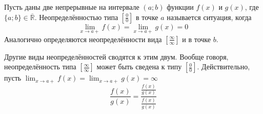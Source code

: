 Пусть даны две непрерывные на интервале $(a; b)$ функции $f(x)$ и $g(x)$, где $\{a; b\} \in \overline{\mathbb{R}}$. Неопределённостью типа $\left[\frac{0}{0}\right]$ в точке $a$ называется ситуация, когда
\[
\lim_{x \to a+}f(x) = \lim_{x \to a+}g(x) = 0
\]
Аналогично определяются неопределённости вида $\left[\frac{\infty}{\infty}\right]$ и в точке $b$.

Другие виды неопределённостей сводятся к этим двум. Вообще говоря, неопределённость типа $\left[\frac{\infty}{\infty}\right]$ может быть сведена к типу $\left[\frac{0}{0}\right]$. Действительно, пусть
$\lim_{x \to a+}f(x) = \lim_{x \to a+}g(x) = \infty$
\[
\frac{f(x)}{g(x)}=\frac{\frac{f(x)}{g(x)}}{\frac{f(x)}{g(x)}}
\]
 




